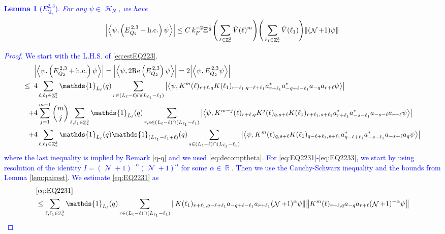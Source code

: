 \documentclass[sn-mathphys, Numbered ,a4paper]{sn-jnl}%
\DeclareMathOperator{\R}{\mathbb{R}}
\DeclareMathOperator{\Z}{\mathbb{Z}}
\DeclareMathOperator{\HH}{\mathcal{H}}
\DeclareMathOperator{\NN}{\mathcal{N}}
\newcommand{\half}{\frac{1}{2}}
\newcommand{\eva}[1]{\left\langle #1 \right\rangle}
\theoremstyle{plain}
\newtheorem{lemma}[theorem]{Lemma}
\theoremstyle{definition}
\theoremstyle{remark}
\theoremstyle{plain}
\theoremstyle{definition}
\theoremstyle{remark}
\begin{document}
\textcolor{blue}{\begin{lemma}[$E_{Q_2}^{2,3}$]\label{lem:EQ223}
	For any $\psi \in \HH_N$, we have
	\begin{align}
		\abs{\eva{\psi,\left(E^{\,2,3}_{Q_2}+\mathrm{h.c.}\right) \psi }}
		\leq  C\, k_{F}^{-2} \Xi^{\half} \Bigg(\sum\limits_{\ell \in \Z^3_*} \hat{V}(\ell)^m \Bigg) \Bigg( \sum\limits_{\ell_1 \in \Z^3_*}\hat{V}(\ell_1) \Bigg)  \norm { (\NN+1) \psi } \label{eq:estEQ223}
	\end{align}
\end{lemma}
\begin{proof}
	We start with the L.H.S. of \eqref{eq:estEQ223}.
	\begin{align}
		&\abs{\eva{\psi,\left(E^{\,2,3}_{Q_2}+\mathrm{h.c.}\right) \psi }} = \abs{\eva{\psi,2\mathrm{Re}\left(E^{\,2,3}_{Q_2}\right) \psi }} = 2\abs{\eva{\psi, E^{\,2,3}_{Q_2} \psi }}\nonumber\\
		\leq\;\;&4 \sum\limits_{\ell, \ell_1\in \Z^3_*} \mathds{1}_{L_{\ell}}(q) \sum\limits_{r \in (L_{\ell}-\ell) \cap (L_{\ell_1}-\ell_1)} \abs{\eva{\psi, K^m(\ell)_{r+\ell,q} K(\ell_1)_{r+\ell_1,q-\ell+\ell_1}  a^*_{r+\ell_1}a^*_{-q+\ell-\ell_1}a_{-q}a_{r+\ell} \psi}} \label{eq:EQ2231}\\
		\;+&4 \sum\limits_{j=1}^{m-1} {{m}\choose j} \sum\limits_{\ell, \ell_1\in \Z^3_*}\mathds{1}_{L_{\ell}}(q) \sum\limits_{r,s \in (L_{\ell}-\ell) \cap (L_{\ell_1}-\ell_1)}  \abs{\eva{\psi, K^{m-j}(\ell)_{r+\ell, q} K^{j}(\ell)_{q,s+\ell} K(\ell_1)_{r+\ell_1,s+\ell_1}  a^*_{r+\ell_1}a^*_{-s-\ell_1}a_{-s-\ell}a_{r+\ell} \psi }} \label{eq:EQ2232}\\
		\;+&4\sum\limits_{\ell, \ell_1\in \Z^3_*} \mathds{1}_{L_{\ell}}(q) \mathds{1}_{(L_{\ell_1}-\ell_1+\ell)}(q) \sum\limits_{s \in (L_{\ell}-\ell) \cap (L_{\ell_1}-\ell_1)} \abs{\eva{\psi, K^m(\ell)_{q,s+\ell} K(\ell_1)_{q-\ell+\ell_1,s+\ell_1}  a^*_{q-\ell+\ell_1}a^*_{-s-\ell_1}a_{-s-\ell}a_{q} \psi}} \label{eq:EQ2233}
	\end{align}
	where the last inequality is implied by Remark \ref{q-q} and we used \eqref{eq:decomptheta}.
	For \eqref{eq:EQ2231}-\eqref{eq:EQ2233}, we start by using resolution of the identity $I = (\NN+1)^{-\alpha}(\NN+1)^{\alpha}$ for some $\alpha \in \R$. Then we use the Cauchy-Schwarz inequality and the bounds from Lemma \ref{lem:pairest}.
	We estimate \eqref{eq:EQ2231} as 
	\begin{align}
		&\eqref{eq:EQ2231}\nonumber\\
		&\leq \sum\limits_{\ell, \ell_1\in \Z^3_*} \mathds{1}_{L_{\ell}}(q)  \sum\limits_{r\in(L_{\ell}-\ell) \cap (L_{\ell_1}-\ell_1)} \norm{ K(\ell_1)_{r+\ell_1,q-\ell+\ell_1} a_{-q+\ell-\ell_1} a_{r+\ell_1}(\NN+1)^{\alpha}\psi}\norm{ K^m(\ell)_{r+\ell,q} a_{-q}a_{r+\ell} (\NN+1)^{-\alpha} \psi }\nonumber\\

\end{align}
\end{proof}}
\end{document}

